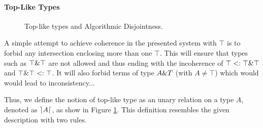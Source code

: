 \paragraph{Top-Like Types}
\begin{figure}[h]


  \caption{Top-like types and Algorithmic Disjointness.}
  \label{fig:tltypesdis}
\end{figure}

A simple attempt to achieve coherence in the presented system with $\top$ is to forbid any intersection enclosing 
more than one $\top$.
This will ensure that types such as $\top \& \top$ are not allowed and thus ending with the incoherence of
$\top <: \top \& \top$ and $\top \& \top <: \top$.
It will also forbid terms of type $A \& T$ (with $A \neq \top$) which would would lead to inconsistency... 

Thus, we define the notion of top-like type as an unary relation on a type $A$, denoted as $\rceil A \lceil$, as show in 
Figure \ref{fig:tltypesdis}.
This definition resembles the given description with two rules.



